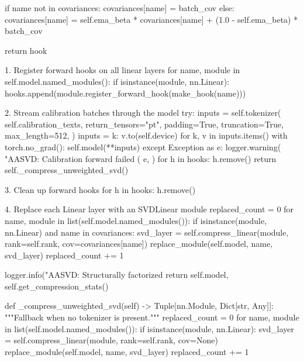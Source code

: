                 if name not in covariances:
                    covariances[name] = batch\_cov
                else:
                    covariances[name] = self.ema\_beta * covariances[name] + (1.0 - self.ema\_beta) * batch\_cov

            return hook

         1. Register forward hooks on all linear layers
        for name, module in self.model.named\_modules():
            if isinstance(module, nn.Linear):
                hooks.append(module.register\_forward\_hook(make\_hook(name)))

         2. Stream calibration batches through the model
        try:
            inputs = self.tokenizer(
                self.calibration\_texts,
                return\_tensors="pt",
                padding=True,
                truncation=True,
                max\_length=512,
            )
            inputs = {k: v.to(self.device) for k, v in inputs.items()}
            with torch.no\_grad():
                self.model(**inputs)
        except Exception as e:
            logger.warning(
                "AASVD: Calibration forward failed (%
                e,
            )
            for h in hooks:
                h.remove()
            return self.\_compress\_unweighted\_svd()

         3. Clean up forward hooks
        for h in hooks:
            h.remove()

         4. Replace each Linear layer with an SVDLinear module
        replaced\_count = 0
        for name, module in list(self.model.named\_modules()):
            if isinstance(module, nn.Linear) and name in covariances:
                svd\_layer = self.compress\_linear(module, rank=self.rank, cov=covariances[name])
                replace\_module(self.model, name, svd\_layer)
                replaced\_count += 1

        logger.info("AASVD: Structurally factorized %
        return self.model, self.get\_compression\_stats()

    def \_compress\_unweighted\_svd(self) -> Tuple[nn.Module, Dict[str, Any]]:
        """Fallback when no tokenizer is present."""
        replaced\_count = 0
        for name, module in list(self.model.named\_modules()):
            if isinstance(module, nn.Linear):
                svd\_layer = self.compress\_linear(module, rank=self.rank, cov=None)
                replace\_module(self.model, name, svd\_layer)
                replaced\_count += 1

